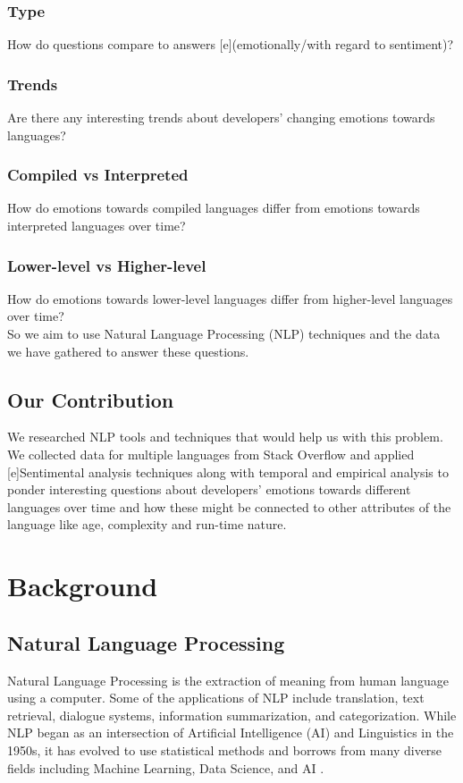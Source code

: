 \documentclass[conference]{IEEEtran}
\begin{document}
 \subsubsection{Type}How do questions compare to answers [e](emotionally/with regard to sentiment)?
 \subsubsection{Trends}Are there any interesting trends about developers' changing emotions towards languages?
 \subsubsection{Compiled vs Interpreted}How do emotions towards compiled languages differ from emotions towards interpreted languages over time?
 \subsubsection{Lower-level vs Higher-level} How do emotions towards lower-level languages differ from higher-level languages over time?\\
 

So we aim to use Natural Language Processing (NLP) techniques and the data we have gathered to answer these questions.

\subsection{Our Contribution}
We researched NLP tools and techniques that would help us with this problem. We collected data for multiple languages from Stack Overflow and applied [e]Sentimental analysis techniques along with temporal and empirical analysis to ponder interesting questions about developers' emotions towards different languages over time and how these might be connected to other attributes of the language like age, complexity and run-time nature.\\

\section{Background}

\subsection{Natural Language Processing}
Natural Language Processing is the extraction of meaning from human language using a computer\cite{b7, b8}. Some of the applications of NLP include translation, text retrieval, dialogue systems, information summarization, and categorization\cite{b7}. While NLP began as an intersection of Artificial Intelligence (AI) and Linguistics in the 1950s, it has evolved to use statistical methods and borrows from many diverse fields including Machine Learning, Data Science, and AI \cite{b8}. \\
\end{document}
